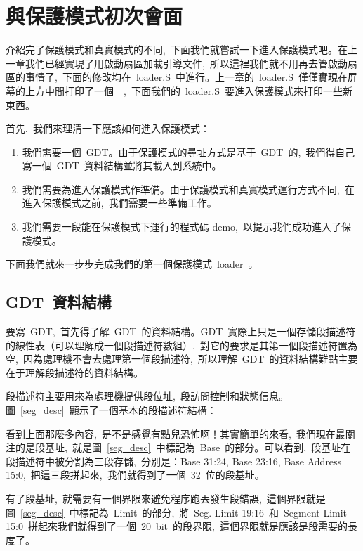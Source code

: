 \section{與保護模式初次會面}

介紹完了保護模式和真實模式的不同,~下面我們就嘗試一下進入保護模式吧。在上一章我們已經實現了用啟動扇區加載引導文件,~所以這裡我們就不用再去管啟動扇區的事情了,~下面的修改均在~loader.S~中進行。上一章的~loader.S~僅僅實現在屏幕的上方中間打印了一個~~,~下面我們的~loader.S~要進入保護模式來打印一些新東西。

首先,~我們來理清一下應該如何進入保護模式：

\begin{enumerate}
  \item 我們需要一個~GDT。由于保護模式的尋址方式是基于~GDT~的,~我們得自己寫一個~GDT~資料結構並將其載入到系統中。
  \item 我們需要為進入保護模式作準備。由于保護模式和真實模式運行方式不同,~在進入保護模式之前,~我們需要一些準備工作。
  \item 我們需要一段能在保護模式下運行的程式碼 demo,~以提示我們成功進入了保護模式。
\end{enumerate}

下面我們就來一步步完成我們的第一個保護模式~loader~。

\subsection{GDT~資料結構}

要寫~GDT,~首先得了解~GDT~的資料結構。GDT~實際上只是一個存儲段描述符的線性表（可以理解成一個段描述符數組）,~對它的要求是其第一個段描述符置為空,~因為處理機不會去處理第一個段描述符,~所以理解~GDT~的資料結構難點主要在于理解段描述符的資料結構。

段描述符主要用來為處理機提供段位址,~段訪問控制和狀態信息。圖~\ref{seg_desc}~顯示了一個基本的段描述符結構：


看到上面那麼多內容,~是不是感覺有點兒恐怖啊！其實簡單的來看,~我們現在最關注的是段基址,~就是圖~\ref{seg_desc}~中標記為~Base~的部分。可以看到,~段基址在段描述符中被分割為三段存儲,~分別是：Base 31:24, Base 23:16, Base Address 15:0,~把這三段拼起來,~我們就得到了一個~32~位的段基址。

有了段基址,~就需要有一個界限來避免程序跑丟發生段錯誤,~這個界限就是圖~\ref{seg_desc}~中標記為~Limit~的部分,~將~Seg. Limit 19:16~和~Segment Limit 15:0~拼起來我們就得到了一個~20~bit~的段界限,~這個界限就是應該是段需要的長度了。

